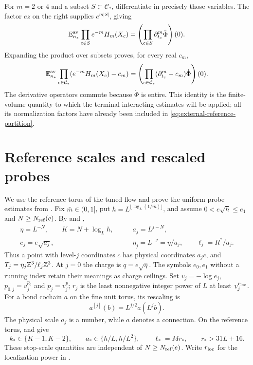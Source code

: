 For $m=2$ or $4$ and a subset $S\subset\mathcal C_*$,
differentiate in precisely those variables. The
factor $ez$ on the right supplies $e^{m|S|}$, giving
\[
 \mathbb E_{n_*}^{\mathrm{av}}\prod_{c\in S}e^{-m}H_m(X_c)
         =\left(\prod_{c\in S}\partial_{t_c}^m
                                      \mathring\Phi\right)(0).
\]
Expanding the product over subsets proves, for
every real $c_m$,
\begin{equation}\label{eq:external-Wick-product}
 \mathbb E_{n_*}^{\mathrm{av}}
        \prod_{c\in\mathcal C_*}(e^{-m}H_m(X_c)-c_m)
     =\left(\prod_{c\in\mathcal C_*}
                (\partial_{t_c}^m-c_m)\mathring\Phi\right)(0).
\end{equation}
The derivative operators commute because
$\mathring\Phi$ is entire. This identity is the
finite-volume quantity to which the terminal
interacting estimates will be applied; all its
normalization factors have already been included
in \eqref{eq:external-reference-partition}.


\section{Reference scales and rescaled probes}
\label{subsec:interacting-stop-probe}

We use the reference torus of the tuned flow and prove the
uniform probe estimates from \cite[\S21.1]{QED3Master}.
Fix $\bar m\in(0,1]$, put
$h=L^{\lfloor\log_L(1/\bar m)\rfloor}$, and assume
$0<e\sqrt h\le e_1$ and $N\ge N_{\rm ref}(e)$.
By \cite[(47)]{CoverTuning} and
\cite[(53)]{CoverTuning},
\begin{equation}\label{eq:interacting-physical-scales}
 \begin{aligned}
 \eta=L^{-N},\qquad K=N+\log_Lh,\qquad
 &a_j=L^{j-N},\\
 e_j=e\sqrt{a_j},\qquad
 &\eta_j=L^{-j}=\eta/a_j,\qquad \ell_j=R^*/a_j .
 \end{aligned}
\end{equation}
Thus a point with level-$j$ coordinates $c$
has physical coordinates $a_jc$, and
$T_j=\eta_j\mathbb Z^3/\ell_j\mathbb Z^3$.
At $j=0$ the charge is $q=e\sqrt\eta$.
The symbols $e_0,e_1$ without a running
index retain their meanings as charge ceilings.
Set $v_j=-\log e_j$, $p_{0,j}=v_j^{p_0}$ and $p_j=v_j^p$;
$r_j$ is the least nonnegative integer power of $L$ at least
$v_j^{r_{\rm loc}}$.
For a bond cochain $a$ on the fine unit torus,
its rescaling is
\begin{equation}\label{eq:interacting-connection-rescaling}
                    a^{[j]}(b)=L^{j/2}a(L^jb).
\end{equation}
The physical scale $a_j$ is a number, while
$a$ denotes a connection.
On the reference torus,
\cite[(54)]{CoverTuning} and
\cite[(50)]{CoverTuning} give
\[
 k_*\in\{K-1,K-2\},\qquad
 a_*\in\{h/L,h/L^2\},\qquad
 \ell_*=Mr_*,\qquad r_*>31L+16.
\]
These stop-scale quantities are independent
of $N\ge N_{\rm ref}(e)$.
Write $r_{\rm loc}$ for the localization
power in \cite[\S6.1]{CoverTuning}.

